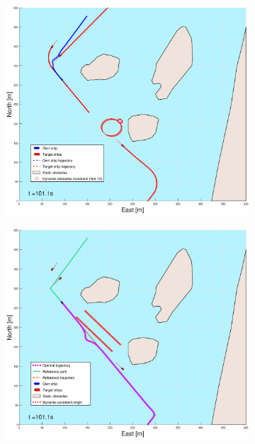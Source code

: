 \begin{figure}[ht]\ContinuedFloat
    \begin{subfigure}[b]{0.49\textwidth}
        \centering
        \includegraphics[width=\textwidth]{Images/Figures/Helloya_Rev/_Simple_1fig1_time=101}
    \end{subfigure}
    \hfill
    \begin{subfigure}[b]{0.499\textwidth}
        \centering
        \includegraphics[width=\textwidth]{Images/Figures/Helloya_Rev/_Simple_1fig999_time=101}

\end{subfigure}
\end{figure}
